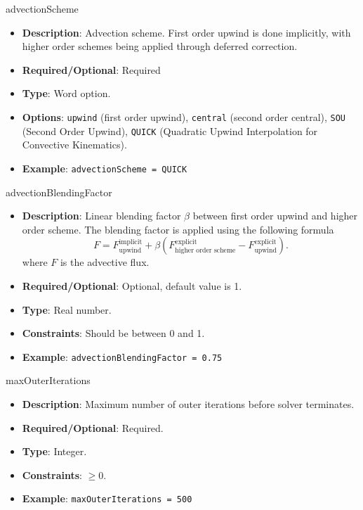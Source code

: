 advectionScheme
\vspace{\the\parameterListSpacing}
\begin{itemize}
    \item {\bf Description}: Advection scheme. First order upwind is done implicitly, with higher order schemes being applied through deferred correction.
    \item {\bf Required/Optional}: Required
    \item {\bf Type}: Word option.
    \item {\bf Options}: \lstinline!upwind! (first order upwind), \lstinline!central! (second order central), \lstinline!SOU! (Second Order Upwind), \lstinline!QUICK! (Quadratic Upwind Interpolation for Convective Kinematics).
    \item {\bf Example}: \lstinline!advectionScheme = QUICK!
\end{itemize}

advectionBlendingFactor
\vspace{\the\parameterListSpacing}
\begin{itemize}
    \item {\bf Description}: Linear blending factor $\beta$ between first order upwind and higher order scheme. The blending factor is applied using the following formula
    \begin{equation*}
        F = F_{\text{upwind}}^{\text{implicit}} + \beta ( F_{\text{higher order scheme}}^{\text{explicit}} - F_{\text{upwind}}^{\text{explicit}}).
    \end{equation*}
    where $F$ is the advective flux.
    \item {\bf Required/Optional}: Optional, default value is 1.
    \item {\bf Type}: Real number.
    \item {\bf Constraints}: Should be between 0 and 1.
    \item {\bf Example}: \lstinline!advectionBlendingFactor = 0.75!
\end{itemize}

maxOuterIterations
\vspace{\the\parameterListSpacing}
\begin{itemize}
    \item {\bf Description}: Maximum number of outer iterations before solver terminates.
    \item {\bf Required/Optional}: Required.
    \item {\bf Type}: Integer.
    \item {\bf Constraints}: $\geq 0$.
    \item {\bf Example}: \lstinline!maxOuterIterations = 500!
\end{itemize}

